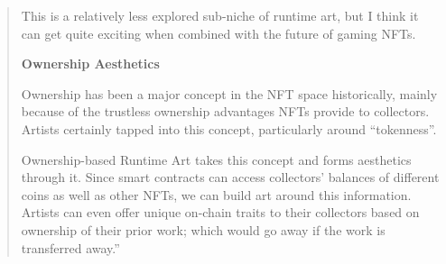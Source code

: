 \begin{quote}
This is a relatively less explored sub-niche of runtime art, but I think it can get quite exciting when combined with the future of gaming NFTs.

\textbf{Ownership Aesthetics}

Ownership has been a major concept in the NFT space historically, mainly because of the trustless ownership advantages NFTs provide to collectors. Artists certainly tapped into this concept, particularly around “tokenness”.

Ownership-based Runtime Art takes this concept and forms aesthetics through it. Since smart contracts can access collectors’ balances of different coins as well as other NFTs, we can build art around this information. Artists can even offer unique on-chain traits to their collectors based on ownership of their prior work; which would go away if the work is transferred away.'' \cite{chainleftOnchainRuntimeArt2024}

\end{quote}